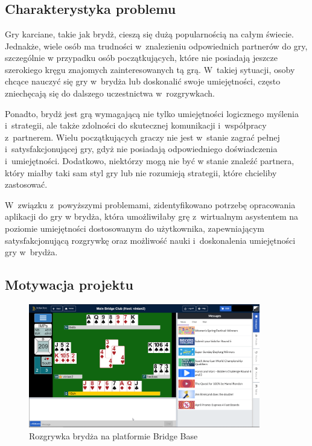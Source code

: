\chapter{\ChapterTitleProjectVision}
\label{sec:cel-wizja}


\section{Charakterystyka problemu}

Gry karciane, takie jak brydż, cieszą się dużą popularnością na całym świecie.
Jednakże, wiele osób ma trudności w~znalezieniu odpowiednich partnerów do gry,
szczególnie w przypadku osób początkujących, które nie posiadają jeszcze
szerokiego kręgu znajomych zainteresowanych tą grą. W~takiej sytuacji, osoby
chcące nauczyć się gry w~brydża lub doskonalić swoje umiejętności, często
zniechęcają się do dalszego uczestnictwa w~rozgrywkach.

Ponadto, brydż jest grą wymagającą nie tylko umiejętności logicznego myślenia
i~strategii, ale także zdolności do skutecznej komunikacji i~współpracy
z~partnerem. Wielu początkujących graczy nie jest w~stanie zagrać pełnej
i~satysfakcjonującej gry, gdyż nie posiadają odpowiedniego doświadczenia
i~umiejętności. Dodatkowo, niektórzy mogą nie być w stanie znaleźć
partnera, który miałby taki sam styl gry lub nie rozumieją strategii,
które chcieliby zastosować.

W~związku z~powyższymi problemami, zidentyfikowano potrzebę opracowania
aplikacji do gry w brydża, która umożliwiłaby grę z~wirtualnym asystentem
na poziomie umiejętności dostosowanym do użytkownika, zapewniającym satysfakcjonującą
rozgrywkę oraz możliwość nauki i~doskonalenia umiejętności gry w~brydża.


\section{Motywacja projektu}

\begin{figure}
    \centering
    \includegraphics[width=0.9\textwidth]{img/brydz-platformy/bridgebase.png}
    \caption{Rozgrywka brydża na platformie Bridge Base}
    \label{fig:bridge-base}
\end{figure}

